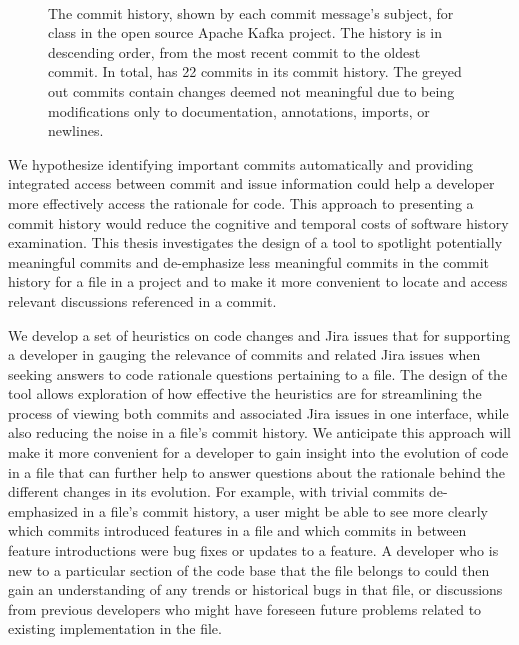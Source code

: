 \begin{figure}
\begin{RaggedRight}
	 \\
	\caption{The commit history, shown by each commit message's subject, for  class in the open source Apache Kafka project. 
		The history is in descending order, from the most recent commit to the oldest commit.
		In total,  has 22 commits in its commit history. The greyed out commits contain changes deemed not meaningful due to being modifications only to documentation, annotations, imports, or newlines.
	}
	\label{fig:Topology-Commit-History}
\end{RaggedRight}
\end{figure}

We hypothesize identifying important commits automatically and providing integrated access between commit and issue information could help a developer more effectively access the rationale for code.
This approach to presenting a commit history would reduce the cognitive and temporal costs of software history examination. 
This thesis investigates the design of a tool to spotlight potentially meaningful commits and de-emphasize less meaningful commits in the commit history for a file in a project and to make it more convenient to locate and access relevant discussions referenced in a commit. 

We develop a set of heuristics on code changes and Jira issues that for supporting a developer in gauging the relevance of commits and related Jira issues when seeking answers to code rationale questions pertaining to a file.
The design of the tool allows exploration of how effective the heuristics are for streamlining the process of viewing both commits and associated Jira issues in one interface, while also reducing the noise in a file's commit history.
We anticipate this approach will make it more convenient for a developer to gain insight into the evolution of code in a file that can further help to answer questions about the rationale behind the different changes in its evolution. 
For example, with trivial commits de-emphasized in a file's commit history, a user might be able to see more clearly which commits introduced features in a file and which commits in between feature introductions were bug fixes or updates to a feature.
A developer who is new to a particular section of the code base that the file belongs to could then gain an understanding of any trends or historical bugs in that file, or discussions from previous developers who might have foreseen future problems related to existing implementation in the file.

